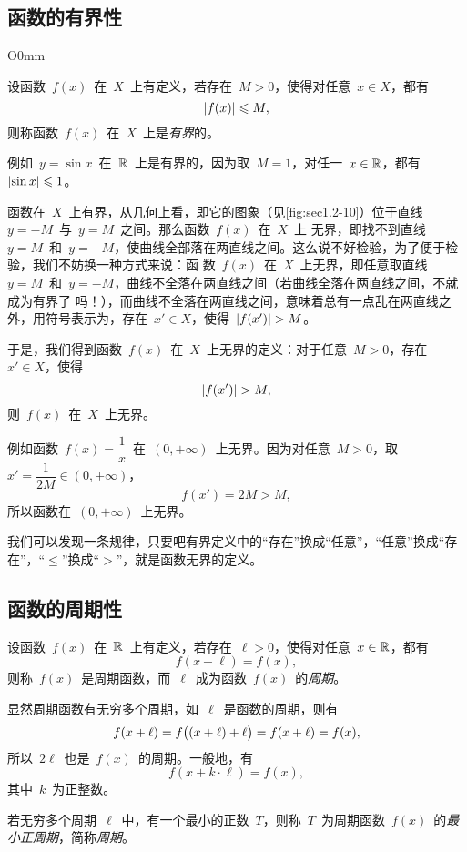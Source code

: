 \subsection{函数的有界性}

\begin{wrapfigure}[10]{O}{0mm}
\somefigure
\caption{有界函数}\label{fig:sec1.2-10}
\end{wrapfigure}

设函数~$f(x)$~在~$X$~上有定义，若存在~$M>0$，使得对任意~$x\in X$，都有
\[
  \lvert f(x)\rvert\leqslant M,
\]
则称函数~$f(x)$~在~$X$~上是\emph{有界}的。

例如~$y=\sin x$~在~$\mathbb{R}$~上是有界的，因为取~$M=1$，对任一~$x\in\mathbb{R}$，都有~$\lvert\sin x\rvert\leqslant1$。

函数在~$X$~上有界，从几何上看，即它的图象（见\ref{fig:sec1.2-10}）位于直线~$y=-M$~与~$y=M$~之间。那么函数~$f(x)$~在~$X$~上
无界，即找不到直线~$y=M$~和~$y=-M$，使曲线全部落在两直线之间。这么说不好检验，为了便于检验，我们不妨换一种方式来说：函
数~$f(x)$~在~$X$~上无界，即任意取直线~$y=M$~和~$y=-M$，曲线不全落在两直线之间（若曲线全落在两直线之间，不就成为有界了
吗！），而曲线不全落在两直线之间，意味着总有一点乱在两直线之外，用符号表示为，存在~$x'\in X$，使得~$\lvert f(x')\rvert>M$。

于是，我们得到函数~$f(x)$~在~$X$~上无界的定义：对于任意~$M>0$，存在~$x'\in X$，使得
\[
  \lvert f(x')\rvert>M,
\]
则~$f(x)$~在~$X$~上无界。

例如函数~$f(x)=\dfrac1x$~在~$(0,+\infty)$~上无界。因为对任意~$M>0$，取~$x'=\dfrac1{2M}\in(0,+\infty)$，
\[
  f(x')=2M>M,
\]
所以函数在~$(0,+\infty)$~上无界。

我们可以发现一条规律，只要吧有界定义中的“存在”换成“任意”，“任意”换成“存在”，“$\leq$”换成“$>$”，就是函数无界的定义。

\subsection{函数的周期性}

设函数~$f(x)$~在~$\mathbb{R}$~上有定义，若存在~$\ell>0$，使得对任意~$x\in\mathbb{R}$，都有
\[
  f(x+\ell)=f(x),
\]
则称~$f(x)$~是周期函数，而~$\ell$~成为函数~$f(x)$~的\emph{周期}。

显然周期函数有无穷多个周期，如~$\ell$~是函数的周期，则有
\[
  f(x+\ell)=f\bigl\lparen(x+\ell)+\ell\bigr\rparen=f(x+\ell)=f(x),
\]
所以~$2\ell$~也是~$f(x)$~的周期。一般地，有
\[
  f(x+k\cdot\ell)=f(x),
\]
其中~$k$~为正整数。

若无穷多个周期~$\ell$~中，有一个最小的正数~$T$，则称~$T$~为周期函数~$f(x)$~的\emph{最小正周期}，简称\emph{周期}。

